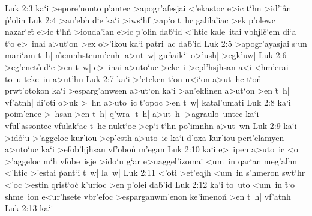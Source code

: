 \vs Luk 2:3
ka`i
>epore'uonto
p'antec
>apogr'afesjai
<'ekastoc
e>ic
t`hn
>i\-d'i\-\r{a}n
\r{p}'o\-lin\bibvsend
{}
\vs Luk 2:4
>an'ebh
d`e
ka`i
>iws`hf
>ap`o
t~hc
galila'iac
>ek
p'olewc
nazar`e\r{t}
e>ic
t`hn\r{}
>iouda'ian
e>ic
p'olin
da\r{b}`id
<'htic
kale~itai
vbhjl\r{e}`em
di`a
t`o
e>~inai
a>ut`on
>ex
o>'ikou
ka`i
patri~ac
da\r{b}'id\bibvsend
\vs Luk 2:5
>apogr'ayasjai
s`un
mari`am
t~h|
\r{m}emnhsteum'enh|
a>ut~w|
gu\r{n}aik`i
o>'ush|
>egk'uw|\bibvsend
\vs Luk 2:6
>eg'eneto\r{}
d`e
>en
t~w|
e>~inai
a>uto`uc
>eke~i
>epl'hsjhsan
a<i
<hm'erai
to~u
teke~in
a>ut'hn\bibvsend
\vs Luk 2:7
ka`i
>'eteken
t`on
u<i`on
a>ut~hc
t`on\r{}
prwt'otokon
ka`i
>esparg'anwsen
a>ut`on
ka`i
>an'eklinen
a>ut`on
>en
\r{t}~h|
vf'atnh|
di'oti
o>uk
>~hn
a>uto~ic
t'opoc
>en
t~w|
katal'umati\bibvsend
\vs Luk 2:8
ka`i
poim'enec
>~hsan
>en
t~h|
q'wra|
t~h|
a>ut~h|
>agraulo~untec
ka`i
vful'assontec
vfulak`ac
t~hc
nukt`oc
>ep`i
t`hn
po'imnhn
a>ut~wn\bibvsend
\vs Luk 2:9
ka`i
>id\r{o}`u
>'aggeloc
kur'iou
>ep'esth
a>uto~ic
ka`i
d'oxa
\r{k}ur'iou
peri'elamyen
a>uto`uc
ka`i
>efob'hjhsan
vf'obon\r{}
m'egan\bibvsend
\vs Luk 2:10
ka`i
e>~ipen
a>uto~ic
<o
>'aggeloc
m`h
vfobe~isje
>ido`u
g`ar
e>uaggel'izomai
<um~in
qar`an
meg'alhn
<'htic
>'estai
\r{p}ant`i
t~w|
la~w|\bibvsend
\vs Luk 2:11
<'oti
>et'eqjh
<um~in
s'hmeron
swt`hr
<'oc
>estin
qrist`oc\r{}
k'urioc
>en
p'olei
da\r{b}'id\bibvsend
{}
\vs Luk 2:12
ka`i
to~uto
<um~in
\r{t}`o
shme~ion
e<ur'hsete
vbr'efoc
>esparganwm'enon
ke'imenon\r{}
>en
t~h|
vf'atnh|\bibvsend
\vs Luk 2:13
ka`i
